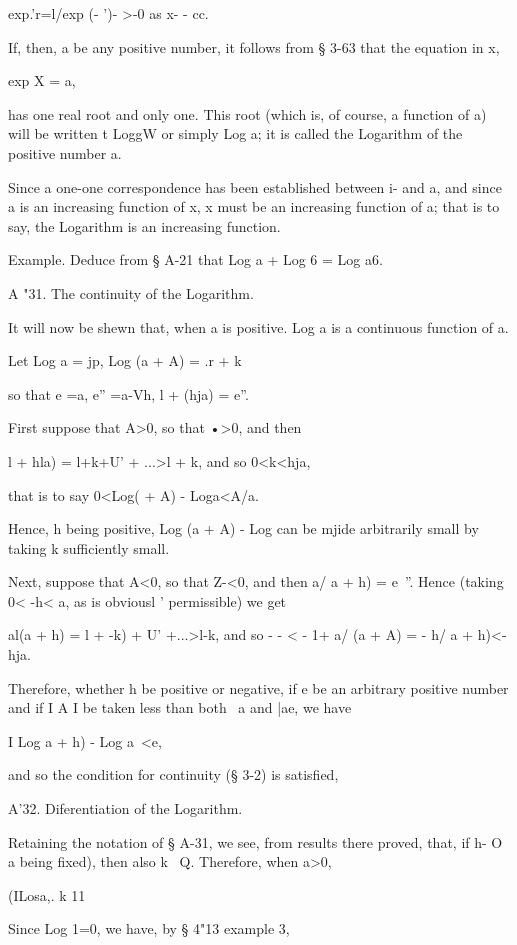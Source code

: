 exp.'r=l/exp (- ')- >-0 as x- - cc.

If, then, a be any positive number, it follows from § 3-63 that the
equation in x,

exp X = a,

has one real root and only one. This root (which is, of course, a
function of a) will be written t LoggW or simply Log a; it is called
the Logarithm of the positive number a.

Since a one-one correspondence has been established between i- and a,
and since a is an increasing function of x, x must be an increasing
function of a; that is to say, the Logarithm is an increasing
function.

Example. Deduce from § A-21 that Log a + Log 6 = Log a6.

A "31. The continuity of the Logarithm.

It will now be shewn that, when a is positive. Log a is a continuous
function of a.

Let Log a = jp, Log (a + A) = .r + k

so that e =a, e'' =a-Vh, l + (hja) = e''.

First suppose that A>0, so that •>0, and then

l + hla) = l+k+U' + ...>l + k, and so 0<k<hja,

that is to say 0<Log( + A) - Loga<A/a.

Hence, h being positive, Log (a + A) - Log can be mjide arbitrarily
small by taking k sufficiently small.

Next, suppose that A<0, so that Z-<0, and then a/ a + h) = e~''. Hence
(taking 0< -h< a, as is obviousl ' permissible) we get

al(a + h) = l + -k) + U' +...>l-k, and so - - < - 1+ a/ (a + A) = - h/
a + h)<- hja.

Therefore, whether h be positive or negative, if e be an arbitrary
positive number and if I A I be taken less than both \ a and |ae, we
have

I Log a + h) - Log a\ <e,

and so the condition for continuity (§ 3-2) is satisfied,

A'32. Diferentiation of the Logarithm.

Retaining the notation of § A-31, we see, from results there proved,
 that, if h- O a being fixed), then also k ~Q. Therefore, when a>0,

(ILosa,. k 11

Since Log 1=0, we have, by § 4"13 example 3,

